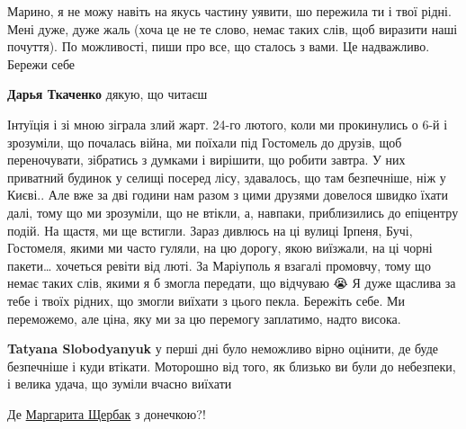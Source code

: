  
 
 
 
 

\qqSecCmt


Марино, я не можу навіть на якусь частину уявити, шо пережила ти і твої рідні.
Мені дуже, дуже жаль (хоча це не те слово, немає таких слів, щоб виразити наші
почуття). По можливості, пиши про все, що сталось з вами. Це надважливо. Бережи
себе 🙏🏼

\begin{itemize} %
\textbf{Дарья Ткаченко} дякую, що читаєш🙏
\end{itemize} %


Інтуїція і зі мною зіграла злий жарт. 24-го лютого, коли ми прокинулись о 6-й і
зрозуміли, що почалась війна, ми поїхали під Гостомель до друзів, щоб
переночувати, зібратись з думками і вирішити, що робити завтра. У них приватний
будинок у селищі посеред лісу, здавалось, що там безпечніше, ніж у Києві.. Але
вже за дві години нам разом з цими друзями довелося швидко їхати далі, тому що
ми зрозуміли, що не втікли, а, навпаки, приблизились до епіцентру подій. На
щастя, ми ще встигли. Зараз дивлюсь на ці вулиці Ірпеня, Бучі, Гостомеля, якими
ми часто гуляли, на цю дорогу, якою виїзжали, на ці чорні пакети… хочеться
ревіти від люті. За Маріуполь я взагалі промовчу, тому що немає таких слів,
якими я б змогла передати, що відчуваю 😭 Я дуже щаслива за тебе і твоїх
рідних, що змогли виїхати з цього пекла. Бережіть себе. Ми переможемо, але
ціна, яку ми за цю перемогу заплатимо, надто висока.

\begin{itemize} %
\textbf{Tatyana Slobodyanyuk} у перші дні було неможливо вірно оцінити, де буде безпечніше і куди втікати. Моторошно від того, як близько ви були до небезпеки, і велика удача, що зуміли вчасно виїхати🙏
\end{itemize} %


Де \href{https://www.facebook.com/margarita.sherbak}{Маргарита Щербак} з донечкою?!


